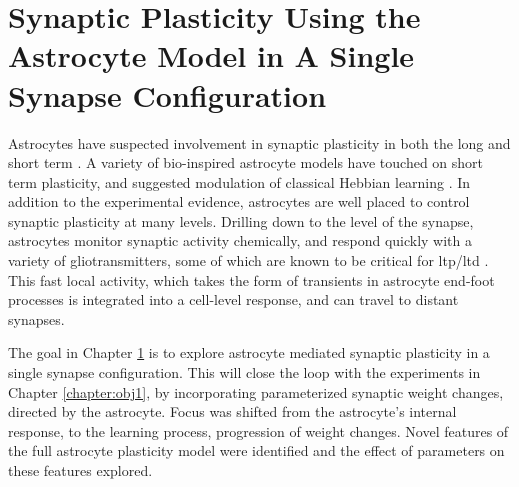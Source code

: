 \chapter{Synaptic Plasticity Using the Astrocyte Model in A Single Synapse
  Configuration} \label{chapter:obj2}

Astrocytes have suspected involvement in synaptic plasticity in both the
long \cite{min_2012} and short term \cite{pitta_2012}. A variety of
bio-inspired astrocyte models have touched on short term plasticity, and
suggested modulation of classical Hebbian learning \cite{pitta_2016}. In
addition to the experimental evidence, astrocytes are well placed to control
synaptic plasticity at many levels. Drilling down to the level of the
synapse, astrocytes monitor synaptic activity chemically, and respond
quickly with a variety of gliotransmitters, some of which are known to be
critical for \gls{ltp}/\gls{ltd} \cite{min_2012}. This fast local activity, which takes
the form of \ca transients in astrocyte end-foot processes is integrated
into a cell-level response, and can travel to distant synapses.

The goal in Chapter \ref{chapter:obj2} is to explore astrocyte mediated synaptic
plasticity in a single synapse configuration. This will close the loop with the
experiments in Chapter \ref{chapter:obj1}, by incorporating parameterized
synaptic weight changes, directed by the astrocyte. Focus was shifted from the
astrocyte's internal response, to the learning process, progression of weight
changes. Novel features of the full astrocyte plasticity model were
identified and the effect of parameters on these features explored.


